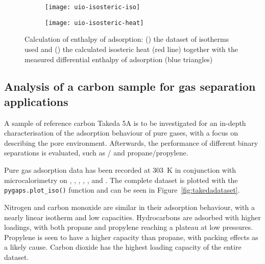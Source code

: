 \begin{figure}[htb]

    \centering
    \begin{subfigure}[b]{.5\textwidth}
        \centering
        \texttt{[image: uio-isosteric-iso]}
        \caption{}%
        \label{calo:fig:uioisostericiso}
    \end{subfigure}%
    \begin{subfigure}[b]{.5\textwidth}
        \centering
        \texttt{[image: uio-isosteric-heat]}
        \caption{}%
        \label{calo:fig:uioisostericheat}
    \end{subfigure}
    \caption{Calculation of enthalpy of adsorption: 
    (\protect{}) 
    the dataset of isotherms used and 
    (\protect{}) the calculated
    isosteric heat (red line) together with the measured 
    differential enthalpy of adsorption (blue triangles)}%
    \label{calo:fig:uioisosteric}

\end{figure}

\subsection{Analysis of a carbon sample for gas separation applications}

A sample of reference carbon Takeda 5A is to be investigated for an in-depth characterisation of
the adsorption behaviour of pure gases, with a focus on describing the pore environment.
Afterwards, the performance of different binary separations is evaluated, 
such as / and propane/propylene.

Pure gas adsorption data has been recorded at \SI{303}{\kelvin} in 
conjunction with 
microcalorimetry on , , , , ,
 and . The complete dataset is plotted with the 
\lstinline{pygaps.plot_iso()} function and can be seen in Figure~\ref{fig:takedadataset}.

Nitrogen and carbon monoxide are similar in their adsorption behaviour,
with a nearly linear isotherm and low capacities.
Hydrocarbons are adsorbed with higher loadings, with both propane and propylene 
reaching a plateau at low pressures. Propylene is seen to have a 
higher capacity than propane, with packing effects as a likely cause.
Carbon dioxide has the highest loading capacity of the entire dataset.

